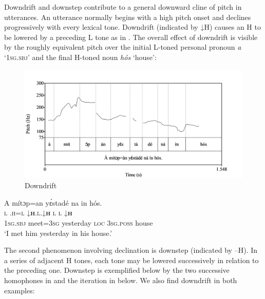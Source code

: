 Downdrift and downstep contribute to a general downward cline of pitch in utterances. An utterance normally begins with a high pitch onset and declines progressively with every lexical tone. Downdrift (indicated by ↓H) causes an H to be lowered by a preceding L tone as in . The overall effect of downdrift is visible by the roughly equivalent pitch over the initial L-toned personal pronoun \textit{a} ‘\textsc{1sg.sbj}’ and the final H-toned noun \textit{hós} ‘house’:

\begin{figure}
\caption{Downdrift}
\label{fig:key:3.16}
\includegraphics[height=.3\textheight]{figures/yakpomod-img18.png}
\end{figure}
 


\ea%
    \label{ex:key:55}
    \glll   A    mítɔp=an  yɛ́stadé    na  in  hós.\\
\textsc{l}    \textsc{.h=l}    \textsc{↓}\textbf{\textsc{h}}\textsc{.l.↓}\textbf{\textsc{h}}    \textsc{l}  \textsc{l}  \textsc{↓}\textbf{\textsc{h}} \\
\textsc{1sg.sbj}  meet=\textsc{3sg}  yesterday  \textsc{loc}  \textsc{3sg.poss}  house\\
\glt ‘I met him yesterday in his house.’    
\z


The second phenomenon involving declination is downstep (indicated by –H). In a series of adjacent H tones, each tone may be lowered successively in relation to the preceding one. Downstep is exemplified below by the two successive homophones in  and the iteration in  below. We also find downdrift in both examples:

 
